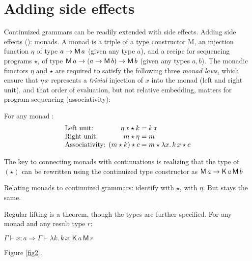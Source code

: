 \section{Adding side effects}
	Continuized grammars can be readily extended with side effects. Adding side effects (\citealt{Wadler:1994, Liangetal}): monads. A monad is a triple  of a type constructor \textsf{M}, an injection function $\eta$ of type $a \rightarrow \textsf{M}\,a$ (given any type $a$), and a recipe for sequencing programs $\star$, of type $\textsf{M}\,a \rightarrow (a \rightarrow \textsf{M}\,b) \rightarrow \textsf{M}\,b$ (given any types $a,b$). The monadic functors $\eta$ and $\star$ are required to satisfy the following three \emph{monad laws}, which ensure that $\eta\,x$ represents a \emph{trivial} injection of $x$ into the monad (left and right unit), and that order of evaluation, but not relative embedding, matters for program sequencing (associativity): %
	\begin{fact}%
		For any monad :
		\[\begin{array}{l@{}r@{}l}
			\text{Left unit: }&\eta\,x \star k &{}= k\,x
			\\
			\text{Right unit: }&m \star \eta &{}= m
			\\
			\text{Associativity: }&(m \star k) \star c &{}= m \star \lambda x.\,k\,x \star c%
		\end{array}\]
	\end{fact}
	
	The key to connecting monads with continuations is realizing that the type of $(\star)$ can be rewritten using the continuized type constructor as $\textsf{M}\,a \rightarrow \textsf{K}\,a\,\textsf{M}\,b$%

	Relating monads to continuized grammars: identify  with $\star$,  with $\eta$. But  stays the same.%
	
	Regular lifting is a theorem, though the types are further specified. For any monad  and any result type $r$:%
	\begin{fact}
		$\Gamma \vdash x : a \Rightarrow \Gamma \vdash \lambda k.\,k\,x : \textsf{K}\,a\,\textsf{M}\,r$%
	\end{fact}
	
	Figure \ref{fig2}.

